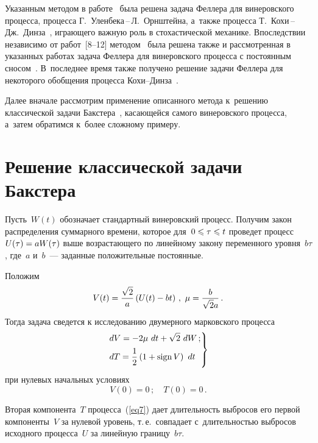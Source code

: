 \begin{multicols}{2}
Указанным методом в работе~\cite{ref14} была решена задача Феллера для винеровского процесса, процесса Г.~Уленбека\,--\,Л.~Орнштейна, а~также процесса Т.~Кохи\,--\,Дж.~Дин\-за~\cite{ref16}, играющего важную роль в стохастической механике. Впоследствии независимо от работ~[8--12] методом~\cite{ref14} была решена также и рассмотренная в указанных работах задача Феллера для винеровского процесса с постоянным сносом~\cite{ref17}. В~последнее время также получено решение задачи Феллера для некоторого обобщения процесса Ко\-хи--Дин\-за~\cite{ref15a}.

Далее вначале рассмотрим применение описанного метода к~решению классической задачи Бакстера~\cite{ref13}, касающейся самого винеровского процесса, а~затем обратимся к~более сложному примеру.


\section{Решение классической задачи Бакстера}

Пусть~$W(t)$ обозначает стандартный винеровский процесс. Получим закон распределения суммарного времени, которое для~$0 \hm\leqslant \tau \hm\leqslant t$ проведет процесс~$U(\tau) \hm= a W(\tau)$ выше возрастающего по линейному закону переменного уровня~$b \tau$, где~$a$ и~$b$~--- заданные положительные постоянные.

Положим
\begin{equation*}
  V(t) = \displaystyle\frac{\displaystyle \sqrt{2}\mathstrut}{\displaystyle a\mathstrut} \left(U(t) - b t\right)\,,\ \mu = \displaystyle\frac{\displaystyle b\mathstrut}{\displaystyle \sqrt{2}a\mathstrut}\,.
\end{equation*}
Тогда задача сведется к исследованию двумерного марковского процесса
\begin{equation}
  \label{eq7}
  \left.
    \begin{aligned}
      &dV = -2 \mu\ dt + \sqrt{2}\ dW\,;\\
      &dT = \displaystyle\frac{\displaystyle 1\mathstrut}{\displaystyle 2\mathstrut} \left(1 + \mathrm{sign}\,
      V\right)\ dt
    \end{aligned}
  \right\}
\end{equation}
при нулевых начальных условиях
\begin{equation*}
  V(0) = 0\,;\quad T(0) = 0\,.
\end{equation*}

Вторая компонента~$T$ процесса~(\ref{eq7}) дает длительность выбросов его первой компоненты~$V$ за нулевой уровень, т.\,е.\ совпадает с~дли\-тель\-ностью выбросов исходного процесса~$U$ за линейную границу~$b \tau$.


\end{multicols}
